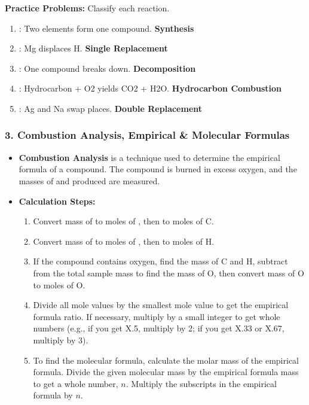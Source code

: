 \documentclass{article}
\begin{document}
\textbf{Practice Problems:} Classify each reaction.
\begin{enumerate}[itemsep=5pt]
    \item {}: Two elements form one compound. \textbf{Synthesis}
    \item {}: Mg displaces H. \textbf{Single Replacement}
    \item {}: One compound breaks down. \textbf{Decomposition}
    \item {}: Hydrocarbon + O2 yields CO2 + H2O. \textbf{Hydrocarbon Combustion}
    \item {}: Ag and Na swap places. \textbf{Double Replacement}
\end{enumerate}

\bigskip
\subsubsection*{3. Combustion Analysis, Empirical \& Molecular Formulas}
\begin{itemize}[itemsep=5pt]
    \item \textbf{Combustion Analysis} is a technique used to determine the empirical formula of a compound. The compound is burned in excess oxygen, and the masses of  and  produced are measured.
    \item \textbf{Calculation Steps:}
    \begin{enumerate}
        \item Convert mass of  to moles of , then to moles of C.
        \item Convert mass of  to moles of , then to moles of H.
        \item If the compound contains oxygen, find the mass of C and H, subtract from the total sample mass to find the mass of O, then convert mass of O to moles of O.
        \item Divide all mole values by the smallest mole value to get the empirical formula ratio. If necessary, multiply by a small integer to get whole numbers (e.g., if you get X.5, multiply by 2; if you get X.33 or X.67, multiply by 3).
        \item To find the molecular formula, calculate the molar mass of the empirical formula. Divide the given molecular mass by the empirical formula mass to get a whole number, $n$. Multiply the subscripts in the empirical formula by $n$.
    \end{enumerate}
\end{itemize}
\end{document}
